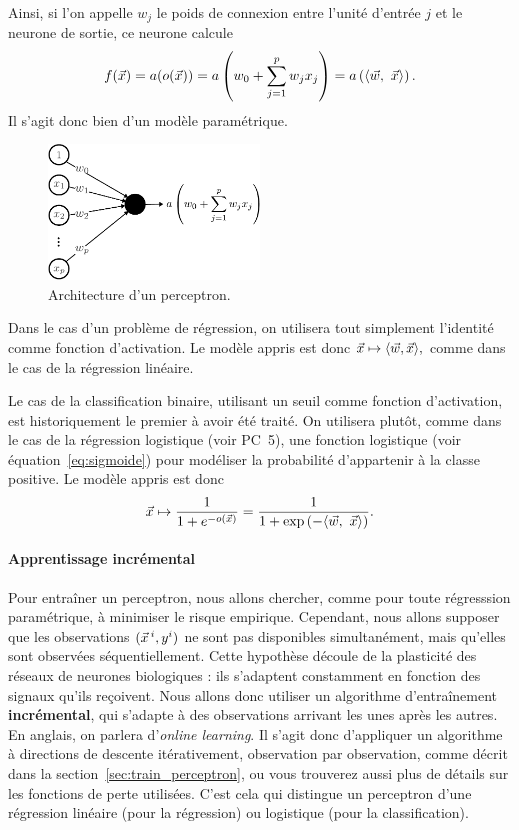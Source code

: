 Ainsi, si l'on appelle $w_j$ le poids de connexion entre l'unité d'entrée $j$
et le neurone de sortie, ce neurone calcule
\begin{equation}
  \label{eq:perceptron_sortie}
  f(\xx) = a(o(\xx)) = a\left(w_0 + \sum_{j=1}^p w_j x_j \right) 
  = a\left(\innerproduct{\ww,~\xx} \right).
\end{equation}
Il s'agit donc bien d'un modèle paramétrique.

\begin{figure}[h]
  \centering
  \includegraphics[width=0.5\textwidth]{figures/nonlin/perceptron}
  \caption{Architecture d'un perceptron. }
  \label{fig:perceptron}
\end{figure}

Dans le cas d'un problème de régression, on utilisera tout simplement l'identité comme fonction d'activation. Le modèle appris est donc $\xx \mapsto \innerproduct{\ww, \xx},$ comme dans le cas de la régression linéaire.

Le cas de la classification binaire, utilisant un seuil comme fonction
d'activation, est historiquement le premier à avoir été traité.  On utilisera
plutôt, comme dans le cas de la régression logistique (voir PC~5), une fonction
logistique (voir équation~\eqref{eq:sigmoide}) pour modéliser la probabilité
d'appartenir à la classe positive. Le modèle appris est donc
\begin{equation}
  \xx \mapsto \frac1{1 + e^{- o(\xx)}} = 
  \frac1{1 + \exp \left( - \innerproduct{\ww,~\xx} \right)}.
\end{equation}


\paragraph{Apprentissage incrémental} Pour entraîner un perceptron, nous
allons chercher, comme pour toute régresssion paramétrique, à minimiser le
risque empirique.  Cependant, nous allons supposer que les observations
$(\xx^i, y^i)$ ne sont pas disponibles simultanément, mais qu'elles sont
observées séquentiellement. Cette hypothèse découle de la plasticité des
réseaux de neurones biologiques : ils s'adaptent constamment en fonction des
signaux qu'ils reçoivent. Nous allons donc utiliser un algorithme
d'entraînement \textbf{incrémental}, qui s'adapte à des observations arrivant
les unes après les autres. En anglais, on parlera d'\textit{online
  learning}. Il s'agit donc d'appliquer un algorithme à directions de descente
itérativement, observation par observation, comme décrit dans la
section~\ref{sec:train_perceptron}, ou vous trouverez aussi plus de détails sur
les fonctions de perte utilisées. 
C'est cela qui distingue un perceptron d'une régression linéaire (pour la
régression) ou logistique (pour la classification).

